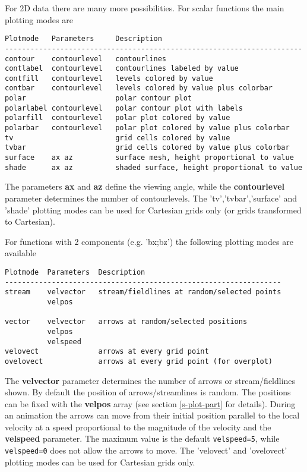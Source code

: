 For 2D data there are many more possibilities.
For scalar functions the main plotting modes are 
\begin{verbatim}
Plotmode   Parameters     Description
----------------------------------------------------------------------
contour    contourlevel   contourlines
contlabel  contourlevel   contourlines labeled by value
contfill   contourlevel   levels colored by value
contbar    contourlevel   levels colored by value plus colorbar
polar                     polar contour plot
polarlabel contourlevel   polar contour plot with labels
polarfill  contourlevel   polar plot colored by value
polarbar   contourlevel   polar plot colored by value plus colorbar
tv                        grid cells colored by value
tvbar                     grid cells colored by value plus colorbar
surface    ax az          surface mesh, height proportional to value
shade      ax az          shaded surface, height proportional to value
\end{verbatim}
The parameters {\bf ax} and {\bf az} define the viewing angle,
while the {\bf contourlevel} parameter determines the number 
of contourlevels. The 'tv','tvbar','surface' and 'shade' plotting modes
can be used for Cartesian grids only (or grids transformed to Cartesian).

For functions with 2 components (e.g. 'bx;bz') the following plotting
modes are available
\begin{verbatim}
Plotmode  Parameters  Description
-----------------------------------------------------------------
stream    velvector   stream/fieldlines at random/selected points
          velpos      

vector    velvector   arrows at random/selected positions
          velpos
          velspeed
velovect              arrows at every grid point
ovelovect             arrows at every grid point (for overplot)
\end{verbatim}
The {\bf velvector} parameter determines the number of arrows or
stream/fieldlines shown. By default the position of arrows/streamlines
is random. The positions can be fixed with the {\bf velpos} array
(see section \ref{s-plot-part} for details). 
During an animation the arrows can move from their initial position
parallel to the local velocity at a speed proportional to the magnitude
of the velocity and the {\bf velspeed} parameter. The maximum value
is the default {\tt velspeed=5}, while {\tt velspeed=0} does not allow
the arrows to move. 
The 'velovect' and 'ovelovect' plotting modes 
can be used for Cartesian grids only.

